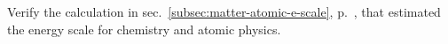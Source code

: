 Verify the calculation in sec.~\ref{subsec:matter-atomic-e-scale}, p.~\pageref{subsec:matter-atomic-e-scale},
that estimated the energy scale for chemistry and atomic physics.
